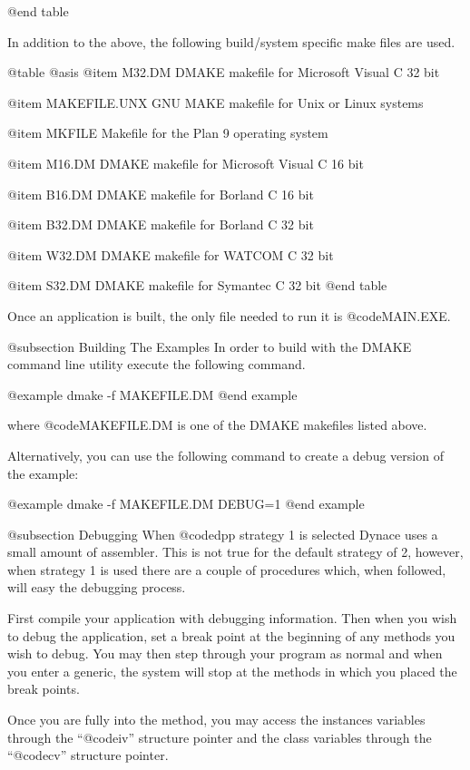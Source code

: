 @end table


In addition to the above, the following build/system specific make 
files are used.

@table @asis
@item M32.DM
DMAKE makefile for Microsoft Visual C 32 bit

@item MAKEFILE.UNX
GNU MAKE makefile for Unix or Linux systems

@item MKFILE
Makefile for the Plan 9 operating system

@item M16.DM
DMAKE makefile for Microsoft Visual C 16 bit

@item B16.DM
DMAKE makefile for Borland C 16 bit

@item B32.DM
DMAKE makefile for Borland C 32 bit

@item W32.DM
DMAKE makefile for WATCOM C 32 bit

@item S32.DM
DMAKE makefile for Symantec C 32 bit
@end table


Once an application is built, the only file needed to run it is
@code{MAIN.EXE}.



@subsection Building The Examples
In order to build with the DMAKE command line utility execute the
following command.

@example
dmake -f MAKEFILE.DM
@end example

where @code{MAKEFILE.DM} is one of the DMAKE makefiles listed above.

Alternatively, you can use the following command to create a debug
version of the example:

@example
dmake -f MAKEFILE.DM  DEBUG=1
@end example



@subsection Debugging
When @code{dpp} strategy 1 is selected Dynace uses a small amount of
assembler.  This is not true for the default strategy of 2, however,
when strategy 1 is used there are a couple of procedures which, when
followed, will easy the debugging process.

First compile your application with debugging information.  Then when you
wish to debug the application, set a break point at the beginning of any
methods you wish to debug.  You may then step through your program as
normal and when you enter a generic, the system will stop at the
methods in which you placed the break points.

Once you are fully into the method, you may access the instances
variables through the ``@code{iv}'' structure pointer and the
class variables through the ``@code{cv}'' structure pointer.



